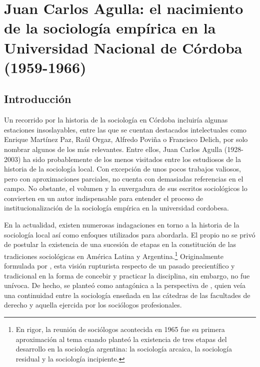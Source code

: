 \chapter[Juan Carlos Agulla: el nacimiento de la sociología empírica en la Universidad Nacional de Córdoba (1959-1966)]{Juan Carlos Agulla: el nacimiento de la sociología empírica en la Universidad Nacional de Córdoba (1959-1966)}

\section{Introducción}

Un recorrido por la historia de la sociología en Córdoba incluiría algunas estaciones insoslayables, entre las que se cuentan destacados intelectuales como Enrique Martínez Paz, Raúl Orgaz, Alfredo Poviña o Francisco Delich, por solo nombrar algunos de los más relevantes. Entre ellos, Juan Carlos Agulla (1928-2003) ha sido probablemente de los menos visitados entre los estudiosos de la historia de la sociología local. Con excepción de unos pocos trabajos \parencite{1447-CARACCIOLO2010,1558-CHAMORROGRECA2007,1674-GRISENDI2012,1675-GRISENDI2013,1680-GONZALEZ2017} valiosos, pero con aproximaciones parciales, no cuenta con demasiadas referencias en el campo. No obstante, el volumen y la envergadura de sus escritos sociológicos lo convierten en un autor indispensable para entender el proceso de institucionalización de la sociología empírica en la universidad cordobesa.

En la actualidad, existen numerosas indagaciones en torno a la historia de la sociología local así como enfoques utilizados para abordarla. El propio \textcite{1631-AGULLA1984} no se privó de postular la existencia de una sucesión de etapas en la constitución de las tradiciones sociológicas en América Latina y Argentina.\footnote{En rigor, la reunión de sociólogos acontecida en 1965 \parencite{1632-AGULLA1966} fue su primera aproximación al tema cuando planteó la existencia de tres etapas del desarrollo en la sociología argentina: la sociología arcaica, la sociología residual y la sociología incipiente.} Originalmente formulada por \textcite{1681-GERMANI1964}, esta visión rupturista respecto de un pasado precientífico y tradicional en la forma de concebir y practicar la disciplina, sin embargo, no fue unívoca. De hecho, se planteó como antagónica a la perspectiva de \textcite{1534-POVINA1959}, quien veía una continuidad entre la sociología enseñada en las cátedras de las facultades de derecho y aquella ejercida por los sociólogos profesionales.

